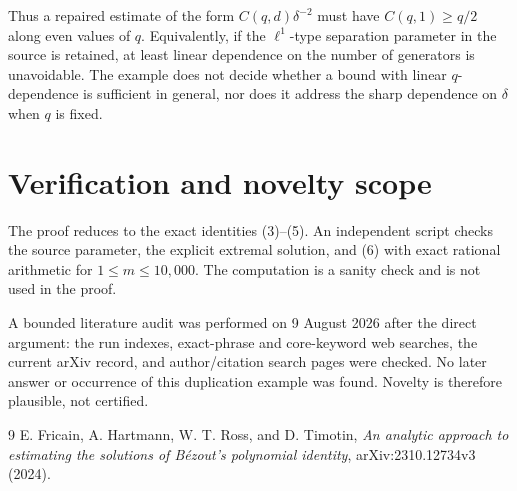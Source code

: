 \documentclass[11pt]{article}
\begin{document}
Thus a repaired estimate of the form
\(C(q,d)\delta^{-2}\) must have \(C(q,1)\ge q/2\) along even values of
\(q\).  Equivalently, if the \(\ell^1\)-type separation parameter in the
source is retained, at least linear dependence on the number of generators
is unavoidable.  The example does not decide whether a bound with linear
\(q\)-dependence is sufficient in general, nor does it address the sharp
dependence on \(\delta\) when \(q\) is fixed.

\section{Verification and novelty scope}

The proof reduces to the exact identities (3)--(5).  An independent script
checks the source parameter, the explicit extremal solution, and (6) with
exact rational arithmetic for \(1\le m\le10{,}000\).  The computation is a
sanity check and is not used in the proof.

A bounded literature audit was performed on 9 August 2026 after the direct
argument: the run indexes, exact-phrase and core-keyword web searches, the
current arXiv record, and author/citation search pages were checked.  No later
answer or occurrence of this duplication example was found.  Novelty is
therefore plausible, not certified.

\begin{thebibliography}{9}
E. Fricain, A. Hartmann, W. T. Ross, and D. Timotin,
\emph{An analytic approach to estimating the solutions of B\'ezout's
polynomial identity}, arXiv:2310.12734v3 (2024).
\end{thebibliography}
\end{document}
